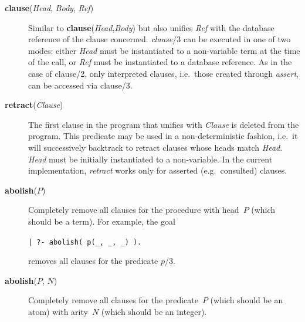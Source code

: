 \begin{description}
\item[{\bf clause}({\em Head}, {\em Body}, {\em Ref})]
    Similar to {\bf clause}({\em Head},{\em Body}) but also unifies {\em Ref}
    with the database reference of the clause concerned.
    {\em clause}/3 can be executed in one of two modes:
    either {\em Head} must be instantiated to a non-variable
    term at the time of the call,
    or {\em Ref} must be instantiated to a database reference.
    As in the case of clause/2, only interpreted clauses,
    i.e.\ those created through {\em assert}, can be accessed via clause/3.

\item[{\bf retract}({\em Clause})]
    The first clause in the program that unifies with {\em Clause} is deleted
    from the program.
    This predicate may be used in a non-deterministic fashion,
    i.e.\ it will successively backtrack to retract clauses
    whose heads match {\em Head}.
    {\em Head} must be initially instantiated to a non-variable.
    In the current implementation,
    {\em retract} works only for asserted (e.g.\ consulted) clauses.

\item[{\bf abolish}($P$)] 
    Completely remove all clauses for the procedure with head~$P$
    (which should be a term).
    For example, the goal
    \begin{center}
    {\tt | ?- abolish( p(\_, \_, \_) ).}
    \end{center}
    removes all clauses for the predicate $p$/3.

\item[{\bf abolish}($P$, $N$)] 
    Completely remove all clauses for the predicate~$P$
    (which should be an atom) with arity~$N$ (which should be an integer).
\end{description}

